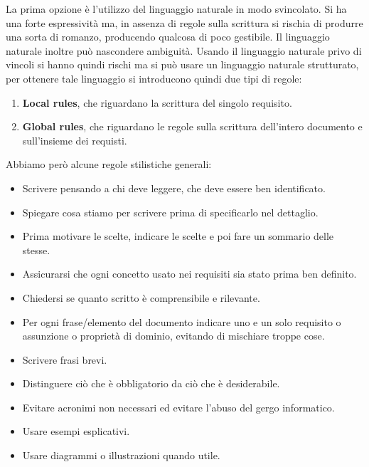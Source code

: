 La prima opzione è l'utilizzo del linguaggio naturale in modo svincolato. Si ha una forte espressività ma, in assenza di regole sulla scrittura si rischia di produrre una sorta di romanzo, producendo qualcosa di poco gestibile. Il linguaggio naturale inoltre può nascondere ambiguità. Usando il linguaggio naturale privo di vincoli si hanno quindi rischi ma si può usare un linguaggio naturale strutturato, per ottenere tale linguaggio si introducono quindi due tipi di regole:
\begin{enumerate}
    \item \textbf{Local rules}, che riguardano la scrittura del singolo requisito.
    \item \textbf{Global rules}, che riguardano le regole sulla scrittura dell'intero documento e sull'insieme dei requisti.
\end{enumerate}
Abbiamo però alcune regole stilistiche generali: 
\begin{itemize}
    \item Scrivere pensando a chi deve leggere, che deve essere ben identificato.
    \item Spiegare cosa stiamo per scrivere prima di specificarlo nel dettaglio.
    \item Prima motivare le scelte, indicare le scelte e poi fare un sommario delle stesse.
    \item Assicurarsi che ogni concetto usato nei requisiti sia stato prima ben definito.
    \item Chiedersi se quanto scritto è comprensibile e rilevante.
    \item Per ogni frase/elemento del documento indicare uno e un solo requisito o assunzione o proprietà di dominio, evitando di mischiare troppe cose.
    \item Scrivere frasi brevi.
    \item Distinguere ciò che è obbligatorio da ciò che è desiderabile.
    \item Evitare acronimi non necessari ed evitare l'abuso del gergo informatico.
    \item Usare esempi esplicativi.
    \item Usare diagrammi o illustrazioni quando utile.
\end{itemize}

